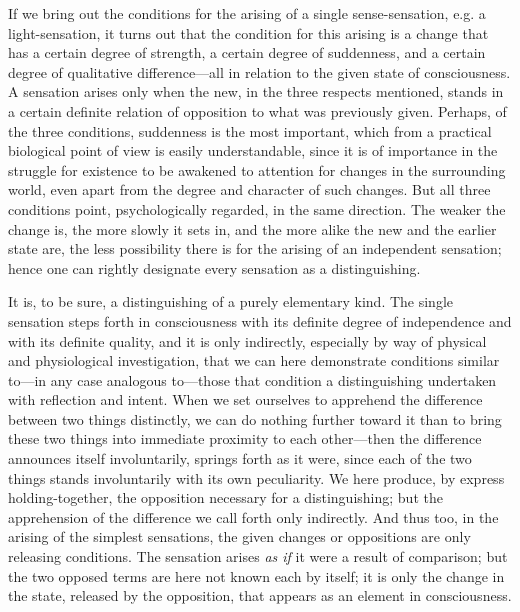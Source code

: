 \documentclass[12pt,a4paper]{book}
\newcommand{\opage}[1]{\marginnote{\footnotesize\textit{[#1]}}}
\begin{document}
If we bring out the conditions for the arising of a single
sense-sensation, e.g. a light-sensation, it turns out that the condition
for this arising is a change that has a certain degree of strength, a
certain degree of suddenness, and a certain degree of qualitative
difference---all in relation to the given state of consciousness. A
sensation arises only when the new, in the three respects mentioned,
stands in a certain definite relation of opposition to what was
previously given. \opage{38}Perhaps, of the three conditions, suddenness is the
most important, which from a practical biological point of view is easily
understandable, since it is of importance in the struggle for existence
to be awakened to attention for changes in the surrounding world, even
apart from the degree and character of such changes. But all three
conditions point, psychologically regarded, in the same direction. The
weaker the change is, the more slowly it sets in, and the more alike the
new and the earlier state are, the less possibility there is for the
arising of an independent sensation; hence one can rightly designate
every sensation as a distinguishing.

It is, to be sure, a distinguishing of a purely elementary kind. The
single sensation steps forth in consciousness with its definite degree
of independence and with its definite quality, and it is only indirectly,
especially by way of physical and physiological investigation, that we
can here demonstrate conditions similar to---in any case analogous
to---those that condition a distinguishing undertaken with reflection and
intent. When we set ourselves to apprehend the difference between two
things distinctly, we can do nothing further toward it than to bring
these two things into immediate proximity to each other---then the
difference announces itself involuntarily, springs forth as it were,
since each of the two things stands involuntarily with its own
peculiarity. We here produce, by express holding-together, the opposition
necessary for a distinguishing; but the apprehension of the difference we
call forth only indirectly. And thus too, in the arising of the simplest
sensations, the given changes or oppositions are only releasing
conditions. The sensation arises \emph{as if} it were a result of comparison;
but the two opposed terms are here not known each by itself; it is only
the change in the state, released by the opposition, that appears as an
element in consciousness.
\end{document}
